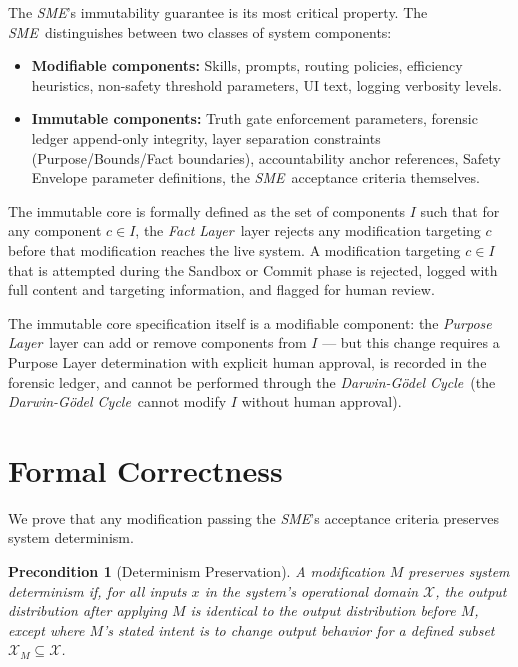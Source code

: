\documentclass[12pt]{article}
\newcommand{\purpose}{\textit{Purpose Layer}}
\newcommand{\fact}{\textit{Fact Layer}}
\newcommand{\sme}{\textit{SME}}
\newcommand{\dgcycle}{\textit{Darwin-G\"odel Cycle}}
\begin{document}
The \sme's immutability guarantee is its most critical property. The \sme\ distinguishes between two classes of system components:

\begin{itemize}[noitemsep]
    \item \textbf{Modifiable components:} Skills, prompts, routing policies, efficiency heuristics, non-safety threshold parameters, UI text, logging verbosity levels.
    \item \textbf{Immutable components:} Truth gate enforcement parameters, forensic ledger append-only integrity, layer separation constraints (Purpose/Bounds/Fact boundaries), accountability anchor references, Safety Envelope parameter definitions, the \sme\ acceptance criteria themselves.
\end{itemize}

The immutable core is formally defined as the set of components $I$ such that for any component $c \in I$, the \fact\ layer rejects any modification targeting $c$ before that modification reaches the live system. A modification targeting $c \in I$ that is attempted during the Sandbox or Commit phase is rejected, logged with full content and targeting information, and flagged for human review.

The immutable core specification itself is a modifiable component: the \purpose\ layer can add or remove components from $I$ — but this change requires a Purpose Layer determination with explicit human approval, is recorded in the forensic ledger, and cannot be performed through the \dgcycle\ (the \dgcycle\ cannot modify $I$ without human approval).

\section{Formal Correctness}
\label{sec:correctness}

We prove that any modification passing the \sme's acceptance criteria preserves system determinism.

\newtheorem{prereq}{Precondition}
\newtheorem{acceptance}{Acceptance Criterion}
\newtheorem{mainthm}{Theorem}

\begin{prereq}[Determinism Preservation]
\label{prereq:det}
A modification $M$ preserves system determinism if, for all inputs $x$ in the system's operational domain $\mathcal{X}$, the output distribution after applying $M$ is identical to the output distribution before $M$, except where $M$'s stated intent is to change output behavior for a defined subset $\mathcal{X}_M \subseteq \mathcal{X}$.
\end{prereq}
\end{document}
